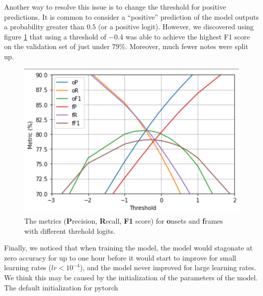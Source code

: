 \documentclass[a4paper,twocolumn,10pt]{article}
\begin{document}
Another way to resolve this issue is to change the threshold for positive predictions. It is common to consider a ``positive'' prediction of the model outputs a probability greater than \(0.5\) (or a positive logit). However, we discovered using figure \ref{fig:threshold} that using a threshold of \(-0.4\) was able to achieve the highest F1 score on the validation set of just under $79\%$. Moreover, much fewer notes were split up.

\begin{figure}[h!]
  \centering
  \includegraphics[width=\linewidth]{figures/threshold.png}
  \caption{The metrics (\textbf{P}recision, \textbf{R}ecall, \textbf{F1} score) for \textbf{o}nsets and \textbf{f}rames with different threhold logits.}
  \label{fig:threshold}
\end{figure}

Finally, we noticed that when training the model, the model would stagonate at zero accuracy for up to one hour before it would start to improve for small learning rates (\(lr<10^{-4}\)), and the model never improved for large learning rates. We think this may be caused by the initialization of the parameters of the model. The default initialization for pytorch  
\end{document}
